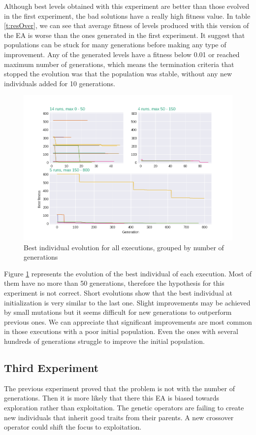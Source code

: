 \documentclass[runningheads,a4paper]{llncs}
\begin{document}
Although best levels obtained with this experiment are better than those 
evolved in the first experiment, the bad solutions have a really high fitness 
value. In table \ref{t:resOver}, we can see that average fitness of levels 
produced with this version of the EA is worse than the ones generated in the 
first experiment. It suggest that populations can be stuck for many generations 
before making any type of improvement. Any of the generated levels have a 
fitness below 0.01 or reached maximum number of generations, which means the 
termination criteria that stopped the evolution was that the population was 
stable, without any new individuals added for 10 generations. 
\begin{figure}[H]
	\centering
	\includegraphics[scale=0.5]{exp2_explication.png}
	\caption{Best individual evolution for all executions, grouped by number of 
	generations}\label{f:grahp2}
\end{figure}
Figure \ref{f:grahp2} represents the evolution of the best individual of each 
execution. Most of them have no more than 50 generations, therefore the 
hypothesis for this experiment is not correct. Short evolutions show that the 
best individual at initialization is very similar to the last one. Slight 
improvements may be achieved by small mutations but it seems difficult for new 
generations to outperform previous ones. We can appreciate that significant 
improvements are most common in those executions with a poor initial 
population. Even the ones with several hundreds of generations struggle to 
improve the initial population.

\subsection{Third Experiment}
The previous experiment proved that the problem is not with the number of 
generations. Then it is more likely that there this EA is biased towards 
exploration rather than exploitation. The genetic operators are failing to 
create new individuals that inherit good traits from their parents. A new 
crossover operator could shift the focus to exploitation.
\end{document}
